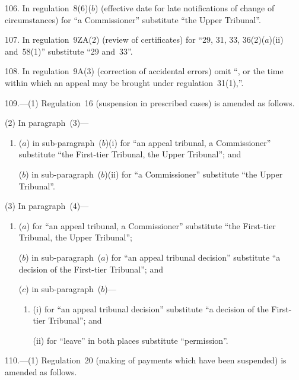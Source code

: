 \documentclass[12pt,a4paper]{article}
\begin{document}
106.  In regulation~8(6)($b$)  (effective date for late notifications of change of circumstances) for “a Commissioner” substitute “the Upper Tribunal”.

\medskip

107.  In regulation~9ZA(2) (review of certificates) for “29, 31, 33, 36(2)($a$)(ii)  and~58(1)” substitute “29 and~33”.

\medskip

108.  In regulation~9A(3) (correction of accidental errors) omit “, or the time within which an appeal may be brought under regulation~31(1),”.

\medskip

109.---(1)  Regulation~16 (suspension in prescribed cases) is amended as follows.

(2) In paragraph~(3)—
\begin{enumerate}\item[]
($a$) in sub-paragraph~($b$)(i)  for “an appeal tribunal, a Commissioner” substitute “the First-tier Tribunal, the Upper Tribunal”; and

($b$) in sub-paragraph~($b$)(ii)  for “a Commissioner” substitute “the Upper Tribunal”.
\end{enumerate}

(3) In paragraph~(4)—
\begin{enumerate}\item[]
($a$) for “an appeal tribunal, a Commissioner” substitute “the First-tier Tribunal, the Upper Tribunal”;

($b$) in sub-paragraph~($a$)  for “an appeal tribunal decision” substitute “a decision of the First-tier Tribunal”; and

($c$) in sub-paragraph~($b$)—
\begin{enumerate}\item[]
(i) for “an appeal tribunal decision” substitute “a decision of the First-tier Tribunal”; and

(ii) for “leave” in both places substitute “permission”.
\end{enumerate}
\end{enumerate}

\medskip

110.---(1)  Regulation~20 (making of payments which have been suspended) is amended as follows.
\end{document}
